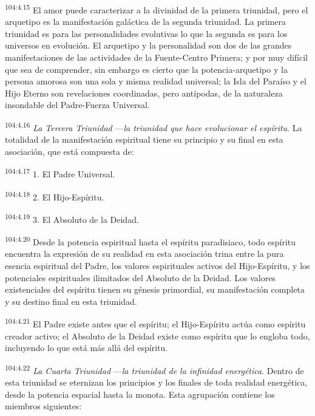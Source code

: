\par
\textsuperscript{104:4.15} El amor puede caracterizar a la divinidad de la primera triunidad, pero el arquetipo es la manifestación galáctica de la segunda triunidad. La primera triunidad es para las personalidades evolutivas lo que la segunda es para los universos en evolución. El arquetipo y la personalidad son dos de las grandes manifestaciones de las actividades de la Fuente-Centro Primera; y por muy difícil que sea de comprender, sin embargo es cierto que la potencia-arquetipo y la persona amorosa son una sola y misma realidad universal; la Isla del Paraíso y el Hijo Eterno son revelaciones coordinadas, pero antípodas, de la naturaleza insondable del Padre-Fuerza Universal.

\par
\textsuperscript{104:4.16} \textit{La Tercera Triunidad} ---\textit{la triunidad que hace evolucionar el espíritu}. La totalidad de la manifestación espiritual tiene su principio y su final en esta asociación, que está compuesta de:

\par
\textsuperscript{104:4.17} 1. El Padre Universal.

\par
\textsuperscript{104:4.18} 2. El Hijo-Espíritu.

\par
\textsuperscript{104:4.19} 3. El Absoluto de la Deidad.

\par
\textsuperscript{104:4.20} Desde la potencia espiritual hasta el espíritu paradisiaco, todo espíritu encuentra la expresión de su realidad en esta asociación trina entre la pura esencia espiritual del Padre, los valores espirituales activos del Hijo-Espíritu, y los potenciales espirituales ilimitados del Absoluto de la Deidad. Los valores existenciales del espíritu tienen su génesis primordial, su manifestación completa y su destino final en esta triunidad.

\par
\textsuperscript{104:4.21} El Padre existe antes que el espíritu; el Hijo-Espíritu actúa como espíritu creador activo; el Absoluto de la Deidad existe como espíritu que lo engloba todo, incluyendo lo que está más allá del espíritu.

\par
\textsuperscript{104:4.22} \textit{La Cuarta Triunidad} ---\textit{la triunidad de la infinidad energética}. Dentro de esta triunidad se eternizan los principios y los finales de toda realidad energética, desde la potencia espacial hasta la monota. Esta agrupación contiene los miembros siguientes:

